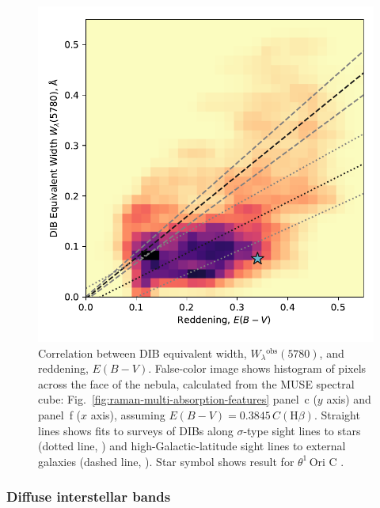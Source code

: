 \documentclass[useAMS, usenatbib, a4paper]{mnras}
\def\th#1#2{\ensuremath{\theta^{#1}\,\text{Ori~#2}}}
\newcommand\hb{\ensuremath{\text{H}\beta}}
\newcommand\observed{\ensuremath{^{\text{obs}}}}
\begin{document}
\begin{figure}
  \centering
  \includegraphics[width=\linewidth]{figs/correlation-DIB-reddening}
  \caption{
    Correlation between DIB equivalent width,
    \(W_\lambda\observed(5780)\), and reddening, \(E(B - V)\).
    False-color image shows histogram of pixels across the face of the nebula,
    calculated from the MUSE spectral cube: 
    Fig.~\ref{fig:raman-multi-absorption-features} panel~c (\(y\) axis)
    and panel~f (\(x\) axis), assuming \(E(B - V) = 0.3845\, C(\hb)\).
    Straight lines shows fits to surveys of DIBs along \(\sigma\)-type sight lines
    to stars (dotted line, \citealp{Kos:2013a})
    and high-Galactic-latitude sight lines to external galaxies
    (dashed line, \citealp{Baron:2015a}).
    Star symbol shows result for \th1C \citep{Friedman:2011a}.
  }
  \label{fig:dib-redden}
\end{figure}


\subsubsection{Diffuse interstellar bands}
\label{sec:solid-state-absorpt}
\end{document}
